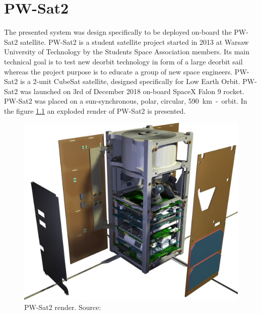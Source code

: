 \chapter{PW-Sat2}
The presented system was design specifically to be deployed on-board the PW-Sat2 satellite. PW-Sat2 is a student satellite project started in 2013 at Warsaw University of Technology by the Students Space Association members. Its main technical goal is to test new deorbit technology in form of a large deorbit sail whereas the project purpose is to educate a group of new space engineers. PW-Sat2 is a 2-unit CubeSat satellite, designed specifically for Low Earth Orbit. PW-Sat2 was launched on 3rd of December 2018 on-board SpaceX Falon 9 rocket. PW-Sat2 was placed on a sun-synchronous, polar, circular, \SI{590}{\kilo\meter}~-~orbit.
In the figure \ref{PW-Sat_render_01} an exploded render of PW-Sat2 is presented.
\begin{figure}[H]
    \centering
    \includegraphics[width=0.65\paperwidth]{img/3/PW-Sat2_render_01.jpg}
    \caption{PW-Sat2 render. Source: \cite{PW_sat2_photo}}
    \label{PW-Sat_render_01}
\end{figure}

